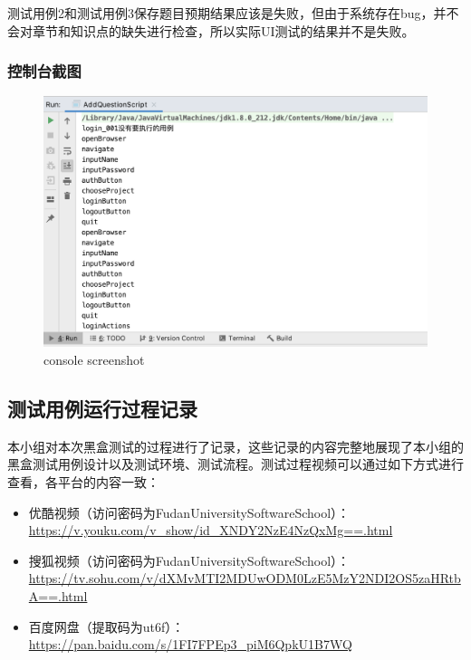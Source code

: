 \documentclass[hyperref, a4paper]{ctexart}
\providecommand{\tightlist}{%
  \setlength{\itemsep}{0pt}\setlength{\parskip}{0pt}}
\begin{document}
测试用例2和测试用例3保存题目预期结果应该是失败，但由于系统存在bug，并不会对章节和知识点的缺失进行检查，所以实际UI测试的结果并不是失败。

\hypertarget{ux63a7ux5236ux53f0ux622aux56fe}{%
\subsubsection{控制台截图}\label{ux63a7ux5236ux53f0ux622aux56fe}}

\begin{figure}
  \centering
  \includegraphics[scale=0.5]{./screenshots/console.jpg}
  \caption{console screenshot}\label{5}
\end{figure}

\hypertarget{ux6d4bux8bd5ux7528ux4f8bux8fd0ux884cux8fc7ux7a0bux8bb0ux5f55}{%
\subsection{测试用例运行过程记录}\label{ux6d4bux8bd5ux7528ux4f8bux8fd0ux884cux8fc7ux7a0bux8bb0ux5f55}}

本小组对本次黑盒测试的过程进行了记录，这些记录的内容完整地展现了本小组的黑盒测试用例设计以及测试环境、测试流程。测试过程视频可以通过如下方式进行查看，各平台的内容一致：

\begin{itemize}
\tightlist
\item
  优酷视频（访问密码为FudanUniversitySoftwareSchool）：\url{https://v.youku.com/v_show/id_XNDY2NzE4NzQxMg==.html}
\item
  搜狐视频（访问密码为FudanUniversitySoftwareSchool）：\url{https://tv.sohu.com/v/dXMvMTI2MDUwODM0LzE5MzY2NDI2OS5zaHRtbA==.html}
\item
  百度网盘（提取码为ut6f）：\url{https://pan.baidu.com/s/1FI7FPEp3_piM6QpkU1B7WQ}
\end{itemize}
\end{document}
